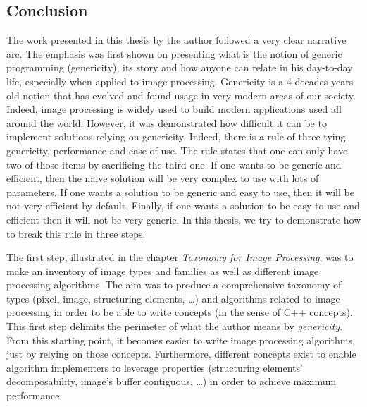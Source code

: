 \subsection*{Conclusion}


The work presented in this thesis by the author followed a very clear narrative arc. The emphasis was first shown on
presenting what is the notion of generic programming (genericity), its story and how anyone can relate in his day-to-day
life, especially when applied to image processing. Genericity is a 4-decades years old notion that has evolved and found
usage in very modern areas of our society. Indeed, image processing is widely used to build modern applications used all
around the world. However, it was demonstrated how difficult it can be to implement solutions relying on genericity.
Indeed, there is a rule of three tying genericity, performance and ease of use. The rule states that one can only have
two of those items by sacrificing the third one. If one wants to be generic and efficient, then the naive solution will
be very complex to use with lots of parameters. If one wants a solution to be generic and easy to use, then it will be
not very efficient by default. Finally, if one wants a solution to be easy to use and efficient then it will not be very
generic. In this thesis, we try to demonstrate how to break this rule in three steps.

The first step, illustrated in the chapter \emph{Taxonomy for Image Processing}, was to make an inventory of image types
and families as well as different image processing algorithms. The aim was to produce a comprehensive taxonomy of types
(pixel, image, structuring elements, \ldots) and algorithms related to image processing in order to be able to write
concepts (in the sense of C++ concepts). This first step delimits the perimeter of what the author means by
\emph{genericity}. From this starting point, it becomes easier to write image processing algorithms, just by relying on
those concepts. Furthermore, different concepts exist to enable algorithm implementers to leverage properties
(structuring elements' decomposability, image's buffer contiguous, \ldots) in order to achieve maximum performance.

